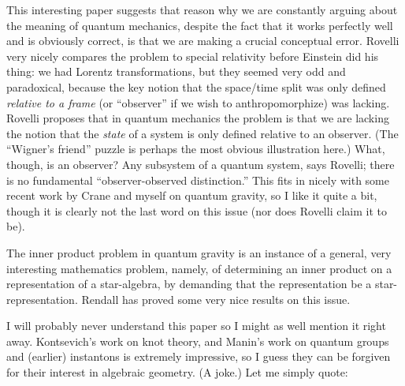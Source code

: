 \documentclass{article}
\def\tightlist{}
\renewcommand{\texttt}[1]{%
  \begingroup
  \ttfamily
  \begingroup\lccode`~=`/\lowercase{\endgroup\def~}{/\discretionary{}{}{}}%
  \begingroup\lccode`~=`[\lowercase{\endgroup\def~}{[\discretionary{}{}{}}%
  \begingroup\lccode`~=`.\lowercase{\endgroup\def~}{.\discretionary{}{}{}}%
  \catcode`/=\active\catcode`[=\active\catcode`.=\active
  \scantokens{#1\noexpand}%
  \endgroup
}
\begin{document}
This interesting paper suggests that reason why we are constantly
arguing about the meaning of quantum mechanics, despite the fact that it
works perfectly well and is obviously correct, is that we are making a
crucial conceptual error. Rovelli very nicely compares the problem to
special relativity before Einstein did his thing: we had Lorentz
transformations, but they seemed very odd and paradoxical, because the
key notion that the space/time split was only defined \emph{relative to
a frame} (or ``observer'' if we wish to anthropomorphize) was lacking.
Rovelli proposes that in quantum mechanics the problem is that we are
lacking the notion that the \emph{state} of a system is only defined
relative to an observer. (The ``Wigner's friend'' puzzle is perhaps the
most obvious illustration here.) What, though, is an observer? Any
subsystem of a quantum system, says Rovelli; there is no fundamental
``observer-observed distinction.'' This fits in nicely with some recent
work by Crane and myself on quantum gravity, so I like it quite a bit,
though it is clearly not the last word on this issue (nor does Rovelli
claim it to be).


The inner product problem in quantum gravity is an instance of a
general, very interesting mathematics problem, namely, of determining an
inner product on a representation of a star-algebra, by demanding that
the representation be a star-representation. Rendall has proved some
very nice results on this issue.


I will probably never understand this paper so I might as well mention
it right away. Kontsevich's work on knot theory, and Manin's work on
quantum groups and (earlier) instantons is extremely impressive, so I
guess they can be forgiven for their interest in algebraic geometry. (A
joke.) Let me simply quote:
\end{document}
